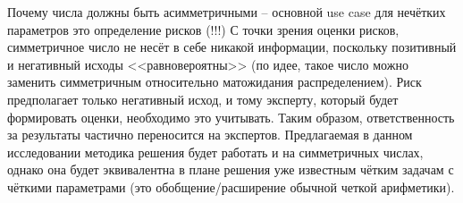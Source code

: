 Почему числа должны быть асимметричными – основной use case для нечётких параметров это определение рисков (!!!) С точки зрения оценки рисков, симметричное число не несёт в себе никакой информации, поскольку позитивный и негативный исходы <<равновероятны>> (по идее, такое число можно заменить симметричным относительно матожидания распределением). Риск предполагает только негативный исход, и тому эксперту, который будет формировать оценки, необходимо это учитывать. Таким образом, ответственность за результаты частично переносится на экспертов. Предлагаемая в данном исследовании методика решения будет работать и на симметричных числах, однако она будет эквивалентна в плане решения уже известным чётким задачам с чёткими параметрами (это обобщение/расширение обычной четкой арифметики).

